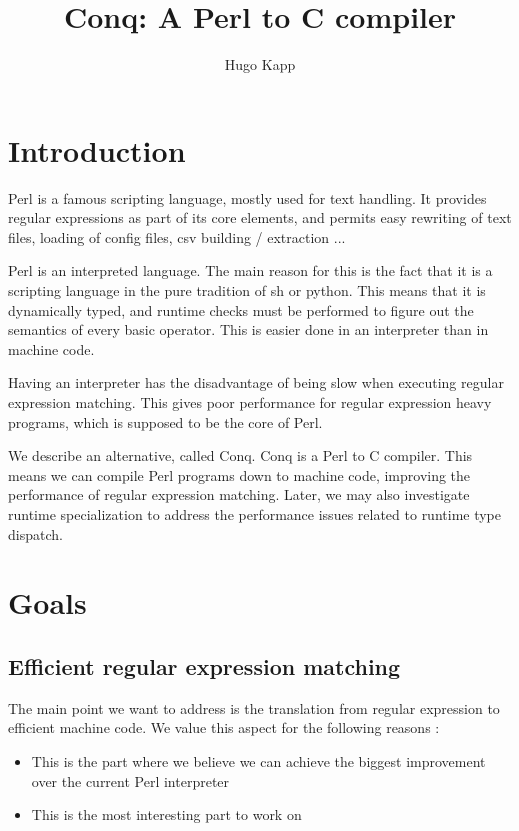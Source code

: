 \documentclass[11pt,a4paper]{report}
\title{Conq: A Perl to C compiler}
\author{Hugo Kapp}
\newcommand{\pgl}[1]{\textsf{#1}}
\begin{document}
\maketitle


\tableofcontents

\chapter*{Introduction}

Perl is a famous scripting language, mostly used for text handling. It provides regular expressions as part of its core elements, and permits easy rewriting of text files, loading of config files, csv building / extraction ...

Perl is an interpreted language. The main reason for this is the fact that it is a scripting language in the pure tradition of \pgl{sh} or \pgl{python}. This means that it is dynamically typed, and runtime checks must be performed to figure out the semantics of every basic operator. This is easier done in an interpreter than in machine code.

Having an interpreter has the disadvantage of being slow when executing regular expression matching. This gives poor performance for regular expression heavy programs, which is supposed to be the core of Perl.


We describe an alternative, called Conq. Conq is a Perl to C compiler. This means we can compile Perl programs down to machine code, improving the performance of regular expression matching. Later, we may also investigate runtime specialization to address the performance issues related to runtime type dispatch.

\chapter{Goals}

\section{Efficient regular expression matching}

The main point we want to address is the translation from regular expression to efficient machine code. We value this aspect for the following reasons :
\begin{itemize}
\item This is the part where we believe we can achieve the biggest improvement over the current Perl interpreter
\item This is the most interesting part to work on
\end{itemize}
\end{document}
